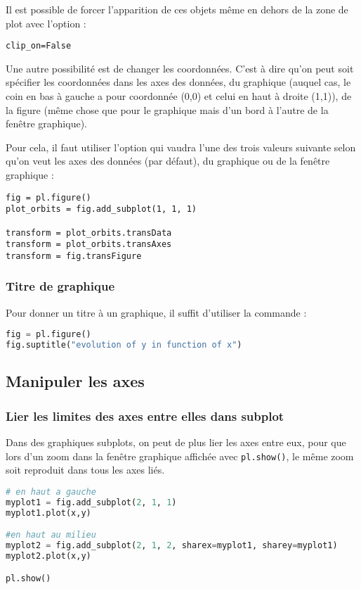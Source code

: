 \documentclass[a4paper,twoside]{article}
\begin{document}
Il est possible de forcer l'apparition de ces objets même en dehors de la zone de plot avec l'option : 
\begin{verbatim}
clip_on=False
\end{verbatim}

\bigskip

Une autre possibilité est de changer les coordonnées. C'est à dire qu'on peut soit spécifier les coordonnées dans les axes des
données, du graphique (auquel cas, le coin en bas à gauche a pour coordonnée (0,0) et celui en haut à droite (1,1)), de la
figure (même chose que pour le graphique mais d'un bord à l'autre de la fenêtre graphique).

Pour cela, il faut utiliser l'option  qui vaudra l'une des trois valeurs suivante selon qu'on veut les axes des
données (par défaut), du graphique ou de la fenêtre graphique : 
\begin{verbatim}
fig = pl.figure()
plot_orbits = fig.add_subplot(1, 1, 1)

transform = plot_orbits.transData
transform = plot_orbits.transAxes
transform = fig.transFigure
\end{verbatim}


\subsubsection{Titre de graphique}
Pour donner un titre à un graphique, il suffit d'utiliser la commande : 
\begin{lstlisting}[language=python]
fig = pl.figure()
fig.suptitle("evolution of y in function of x")
\end{lstlisting}

\subsection{Manipuler les axes}

\subsubsection{Lier les limites des axes entre elles dans subplot}
Dans des graphiques subplots, on peut de plus lier les axes entre eux, pour que lors d'un zoom dans la fenêtre graphique affichée avec \texttt{pl.show()}, le même zoom soit reproduit dans tous les axes liés.

\begin{lstlisting}[language=python]
# en haut a gauche
myplot1 = fig.add_subplot(2, 1, 1)
myplot1.plot(x,y)

#en haut au milieu
myplot2 = fig.add_subplot(2, 1, 2, sharex=myplot1, sharey=myplot1)
myplot2.plot(x,y)

pl.show()
\end{lstlisting}
\end{document}
